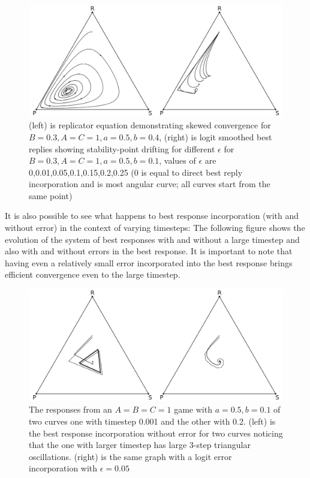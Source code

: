 \documentclass[journal,article,accept,oneauthors,pdftex,10pt,a4paper]{mdpi}
\begin{document}
\begin{figure}[ht]
\centering
\includegraphics[width=0.8\linewidth]{orbit2}
\caption{(left) is replicator equation demonstrating skewed convergence for $B=0.3,A=C=1,a=0.5,b=0.4$, (right) is logit smoothed best replies showing stability-point drifting for different $\epsilon$ for $B=0.3,A=C=1,a=0.5,b=0.1$, values of $\epsilon$ are 0,0.01,0.05,0.1,0.15,0.2,0.25 (0 is equal to direct best reply incorporation and is most angular curve; all curves start from the same point)}
\label{fig:states}
\end{figure}

It is also possible to see what happens to best response incorporation (with and without error) in the context of varying timesteps:
The following figure shows the evolution of the system of best responses with and without a large timestep and also with and without errors in the best response.
It is important to note that having even a relatively small error incorporated into the best response brings efficient convergence even to the large timestep.

\begin{figure}[ht]
\centering
\includegraphics[width=0.8\linewidth]{orbit3}
\caption{The responses from an $A=B=C=1$ game with $a=0.5,b=0.1$ of two curves one with timestep 0.001 and the other with 0.2. (left) is the best response incorporation without error for two curves noticing that the one with larger timestep has large 3-step triangular oscillations. (right) is the same graph with a logit error incorporation with $\epsilon=0.05$}
\label{fig:states}
\end{figure}
\end{document}
